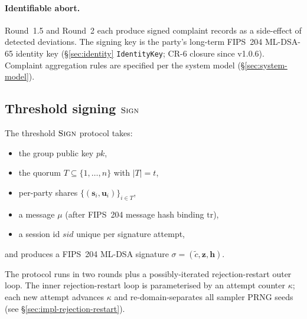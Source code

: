 \documentclass[11pt,a4paper]{article}
\theoremstyle{definition}
\theoremstyle{remark}
\newcommand{\Sign}{\textsc{Sign}}
\begin{document}
\paragraph{Identifiable abort.}
Round~1.5 and Round~2 each produce signed complaint records as a
side-effect of detected deviations. The signing key is the party's
long-term FIPS~204 ML-DSA-65 identity key
(\S\ref{sec:identity} \texttt{IdentityKey}; CR-6 closure since
v1.0.6). Complaint aggregation rules are specified per the system
model (\S\ref{sec:system-model}).

\subsection{Threshold signing \texorpdfstring{$\Sign$}{Sign}}
\label{sec:sign}

The threshold $\Sign$ protocol takes:

\begin{itemize}[leftmargin=*, itemsep=0pt]
\item the group public key $\mathit{pk}$,
\item the quorum $T \subseteq \{1, \dots, n\}$ with $|T| = t$,
\item per-party shares $\{(\mathbf{s}_i, \mathbf{u}_i)\}_{i \in T}$,
\item a message $\mu$ (after FIPS~204 message hash binding $\mathrm{tr}$),
\item a session id $\mathit{sid}$ unique per signature attempt,
\end{itemize}

and produces a FIPS~204 ML-DSA signature
$\sigma = (\tilde c, \mathbf{z}, \mathbf{h})$.

The protocol runs in two rounds plus a possibly-iterated rejection-restart
outer loop. The inner rejection-restart loop is parameterised by an
attempt counter $\kappa$; each new attempt advances $\kappa$ and
re-domain-separates all sampler PRNG seeds (see
\S\ref{sec:impl-rejection-restart}).
\end{document}
